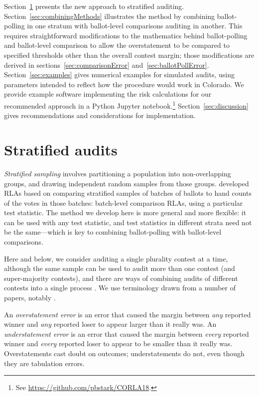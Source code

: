 \documentclass[runningheads]{llncs}
\begin{document}
Section~\ref{sec:stratified} presents the new approach to stratified auditing.
Section~\ref{sec:combiningMethods} illustrates the method by combining ballot-polling in one stratum with ballot-level comparisons auditing in another.
This requires straightforward modifications to the mathematics behind ballot-polling and ballot-level comparison to allow the overstatement to be compared to specified thresholds other than the overall contest margin; those modifications are derived in sections~\ref{sec:comparisonError} and~\ref{sec:ballotPollError}.
Section~\ref{sec:examples} gives numerical examples for simulated audits, using parameters intended to reflect how the procedure would work in Colorado.
We provide example software implementing the risk calculations for
our recommended approach in a Python Jupyter notebook.\footnote{%
 See \url{https://github.com/pbstark/CORLA18}.
}
Section~\ref{sec:discussion} gives recommendations and
considerations for implementation.


\section{Stratified audits} \label{sec:stratified}

\emph{Stratified sampling} involves partitioning a population
into non-overlapping groups, and drawing independent random samples from those groups.
\cite{stark08a,higginsEtal11} developed RLAs based on comparing stratified samples of batches of ballots to hand counts of the votes in those batches: batch-level comparison RLAs, using a particular test statistic.
The method we develop here is more general and more flexible: it can be used with any test statistic, and test statistics in different strata need not be the same---which is key to combining ballot-polling with ballot-level comparisons.

Here and below, we consider auditing a single plurality contest at a time, although the same sample can be used to audit more than one contest (and super-majority contests), and there are ways of combining audits of different contests into a single process \cite{stark09c,stark10d}.
We use terminology drawn from a number of papers, notably \cite{lindemanStark12}.

An \emph{overstatement error} is an error that caused the margin between \emph{any} reported
winner and \emph{any} reported loser to appear larger than it really was.
An \emph{understatement error} is an error that caused the margin between \emph{every} reported
winner and \emph{every} reported loser to appear to be smaller than it really was.
Overstatements cast doubt on outcomes; understatements do not, even though they are tabulation errors.
\end{document}
